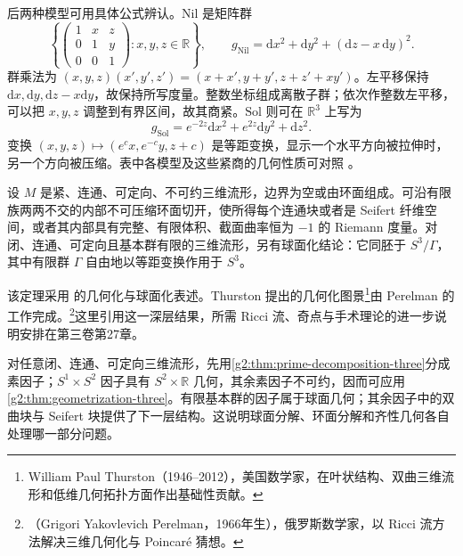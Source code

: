 后两种模型可用具体公式辨认。\(\mathrm{Nil}\) 是矩阵群
\[
	\left\{\begin{pmatrix}1&x&z\\0&1&y\\0&0&1\end{pmatrix}:x,y,z\in\mathbb R\right\},
	\qquad g_{\mathrm{Nil}}=\mathrm{d}x^2+\mathrm{d}y^2+(\mathrm{d}z-x\,\mathrm{d}y)^2.
\]
群乘法为 \((x,y,z)(x',y',z')=(x+x',y+y',z+z'+xy')\)。左平移保持 \(\mathrm{d}x,\mathrm{d}y,\mathrm{d}z-x\mathrm{d}y\)，故保持所写度量。整数坐标组成离散子群；依次作整数左平移，可以把 \(x,y,z\) 调整到有界区间，故其商紧。\(\mathrm{Sol}\) 则可在 \(\mathbb R^3\) 上写为
\begin{equation}\label{g2:eq:sol-metric}
	g_{\mathrm{Sol}}=e^{-2z}\mathrm{d}x^2+e^{2z}\mathrm{d}y^2+\mathrm{d}z^2.
\end{equation}
变换 \((x,y,z)\mapsto(e^c x,e^{-c}y,z+c)\) 是等距变换，显示一个水平方向被拉伸时，另一个方向被压缩。表中各模型及这些紧商的几何性质可对照 \cite[第4节，尤其第467—472页]{Scott1983}。

\begin{theorem}[三维几何化定理]\label{g2:thm:geometrization-three}
	设 \(M\) 是紧、连通、可定向、不可约三维流形，边界为空或由环面组成。可沿有限族两两不交的内部不可压缩环面切开，使所得每个连通块或者是 Seifert 纤维空间，或者其内部具有完整、有限体积、截面曲率恒为 \(-1\) 的 Riemann 度量。对闭、连通、可定向且基本群有限的三维流形，另有球面化结论：它同胚于 \(S^3/\Gamma\)，其中有限群 \(\Gamma\) 自由地以等距变换作用于 \(S^3\)。
\end{theorem}

该定理采用 \cite[第1.7节]{AschenbrennerFriedlWilton2015}的几何化与球面化表述。Thurston 提出的几何化图景\footnote{William Paul Thurston（1946--2012），美国数学家，在叶状结构、双曲三维流形和低维几何拓扑方面作出基础性贡献。}由 Perelman 的工作完成。\footnote{（Grigori Yakovlevich Perelman，1966年生），俄罗斯数学家，以 Ricci 流方法解决三维几何化与 Poincaré 猜想。}这里引用这一深层结果，所需 Ricci 流、奇点与手术理论的进一步说明安排在第三卷第27章。

\ProseParagraphBreak

对任意闭、连通、可定向三维流形，先用\cref{g2:thm:prime-decomposition-three}分成素因子；\(S^1\times S^2\) 因子具有 \(S^2\times\mathbb R\) 几何，其余素因子不可约，因而可应用\cref{g2:thm:geometrization-three}。有限基本群的因子属于球面几何；其余因子中的双曲块与 Seifert 块提供了下一层结构。这说明球面分解、环面分解和齐性几何各自处理哪一部分问题。

